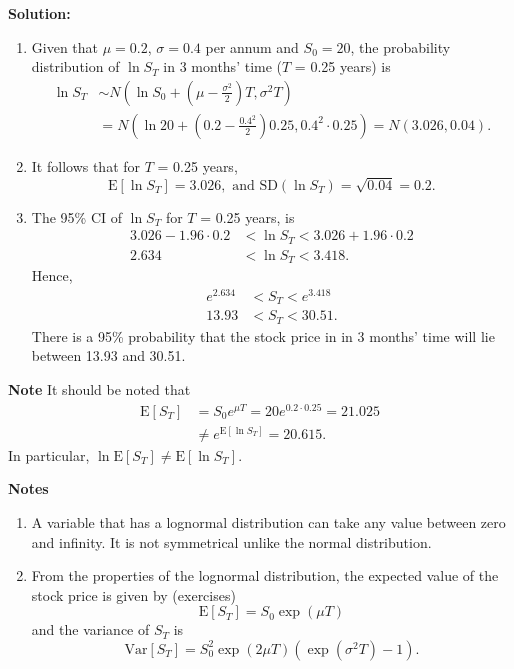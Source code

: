 \documentclass[
]{book}
\theoremstyle{definition}
\theoremstyle{definition}
\theoremstyle{definition}
\theoremstyle{definition}
\theoremstyle{remark}
\begin{document}
\textbf{Solution:}

\begin{enumerate}
\def\labelenumi{\arabic{enumi}.}
\item
  Given that \(\mu = 0.2\), \(\sigma = 0.4\) per annum and \(S_0 = 20\), the
  probability distribution of \(\ln S_T\) in 3 months' time (\(T\) = 0.25
  years) is \[\begin{aligned}
      \ln S_T &\sim  N\left(\ln S_0 +  (\mu - \frac{\sigma^2}{2})T,\sigma^2 T\right) \\
          &= N\left(\ln 20 +  (0.2 - \frac{0.4^2}{2}) 0.25,0.4^2 \cdot 0.25\right) = N(3.026,0.04).\end{aligned}\]
\item
  It follows that for \(T\) = 0.25 years,
  \[\mathrm{E}[\ln S_T] = 3.026,   \text{ and    } \text{SD}(\ln S_T) = \sqrt{0.04} = 0.2.\]
\item
  The 95\% CI of \(\ln S_T\) for \(T\) = 0.25 years, is \[\begin{aligned}
      3.026 - 1.96 \cdot 0.2 &< \ln S_T < 3.026 + 1.96 \cdot 0.2 \\
      2.634 &< \ln S_T < 3.418.\end{aligned}\] Hence,
  \[\begin{aligned}
      e^{2.634} &<  S_T < e^{3.418}\\
          13.93 &<  S_T < 30.51.
      \end{aligned}\] There is a 95\% probability that the stock price
  in in 3 months' time will lie between 13.93 and 30.51.
\end{enumerate}

\textbf{Note} It should be noted that \[\begin{aligned}
    \mathrm{E}[S_T] &= S_0 e^{\mu T} = 20 e^{0.2 \cdot 0.25} = 21.025  \\
     &\neq e^{\mathrm{E}[\ln S_T]}  =  20.615.
    \end{aligned}\] In particular,
\(\ln \mathrm{E}[S_T] \neq \mathrm{E}[\ln S_T]\).

\textbf{Notes}

\begin{enumerate}
\def\labelenumi{\arabic{enumi}.}
\item
  A variable that has a lognormal distribution can take any value
  between zero and infinity. It is not symmetrical unlike the normal
  distribution.
\item
  From the properties of the lognormal distribution, the expected
  value of the stock price is given by (exercises)
  \[\mathrm{E}[S_T] = S_0 \exp (\mu T)\] and the variance of \(S_T\) is
  \[\mathrm{Var}[S_T] = S_0^2 \exp(2 \mu T) (\exp(\sigma^2 T) - 1).\]
\end{enumerate}
\end{document}
